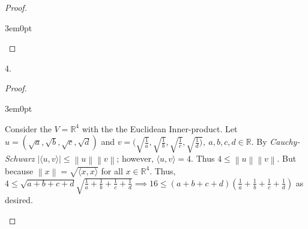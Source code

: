 \documentclass[11pt]{article}
\newcommand{\R}{\mathbb{R}}
\newcommand{\norm}[1]{\left\lVert#1\right\rVert}
\newcommand{\inn}[2]{\langle#1,#2\rangle}
\newenvironment{myproof}
{\begin{proof} \begin{adjustwidth}{3em}{0pt}$ $\par\nobreak\ignorespaces}
{\end{adjustwidth} \end{proof}}
\begin{document}
\begin{flushleft}
\begin{myproof}
\end{myproof}

\newpage

4.

\begin{myproof}

Consider the $V=\R^4$ with the the Euclidean Inner-product. Let $u = (\sqrt{a},\sqrt{b},\sqrt{c},\sqrt{d})$ and $v = (\sqrt{\frac1a} , \sqrt{\frac1b} , \sqrt{\frac1c} , \sqrt{\frac1d)}, \ a,b,c,d \in \R$. By \textit{Cauchy-Schwarz} $|\inn{u}{v}| \leq \norm{u} \norm{v}$; however, $\inn{u}{v} = 4$. Thus $4 \leq \norm{u} \norm{v}$. But because $\norm{x} = \sqrt{\inn{x}{x}}$ for all $x \in \R^4$. Thus, $4 \leq \sqrt{a + b + c + d} \sqrt{\frac1a + \frac1b + \frac1c + \frac1d} \implies 16 \leq (a+b+c+d)(\frac1a + \frac1b + \frac1c + \frac1d)$ as desired.

\end{myproof}

\end{flushleft}
\end{document}
